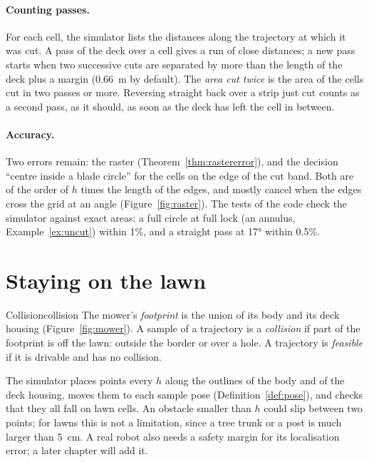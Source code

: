 \paragraph{Counting passes.}
For each cell, the simulator lists the distances along the trajectory at
which it was cut. A pass of the deck over a cell gives a run of close
distances; a new pass starts when two successive cuts are separated by more
than the length of the deck plus a margin (\SI{0.66}{\metre} by default).
The \emph{area cut twice} is the area of the cells cut in two passes or more.
Reversing straight back over a strip just cut counts as a second pass, as it
should, as soon as the deck has left the cell in between.

\paragraph{Accuracy.}
Two errors remain: the raster (Theorem~\ref{thm:rastererror}), and the
decision ``centre inside a blade circle'' for the cells on the edge of the
cut band. Both are of the order of $h$ times the length of the edges, and
mostly cancel when the edges cross the grid at an angle
(Figure~\ref{fig:raster}). The tests of the code check the simulator against
exact areas: a full circle at full lock (an annulus,
Example~\ref{ex:uncut}) within 1\%, and a straight pass at 17° within 0.5\%.

\section{Staying on the lawn}

\begin{definition}{Collision}{collision}
  The mower's \emph{footprint} is the union of its body and its deck housing
  (Figure~\ref{fig:mower}). A sample of a trajectory is a \emph{collision}
  if part of the footprint is off the lawn: outside the border or over a
  hole. A trajectory is \emph{feasible} if it is drivable and has no
  collision.
\end{definition}

The simulator places points every $h$ along the outlines of the body and of
the deck housing, moves them to each sample pose (Definition~\ref{def:pose}),
and checks that they all fall on lawn cells. An obstacle smaller than $h$
could slip between two points; for lawns this is not a limitation, since a
tree trunk or a post is much larger than \SI{5}{\centi\metre}. A real robot
also needs a safety margin for its localisation error; a later chapter will
add it.

